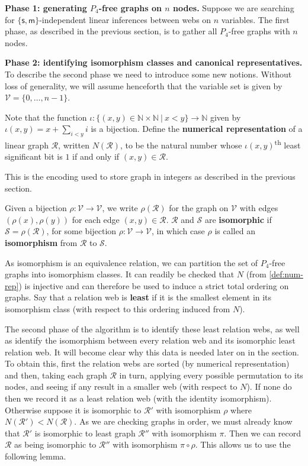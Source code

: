 \documentclass[a4paper, UKenglish, cleveref]{lipics-v2021}
\newcommand{\V}{\ensuremath{\mathcal{V}}}
\newcommand{\R}{\ensuremath{\mathcal{R}}}
\renewcommand*{\S}{\ensuremath{\mathcal{S}}}
\newcommand{\m}{\ensuremath{\mathsf{m}}}
\newcommand{\s}{\ensuremath{\mathsf{s}}}
\begin{document}
\textbf{Phase 1: generating $P_4$-free graphs on $n$ nodes.}
Suppose we are searching for $\{\s,\m \}$-independent linear inferences between webs on \(n\) variables. The first phase, as described in the previous section, is to gather all \(P_4\)-free graphs with \(n\) nodes.

\smallskip

\textbf{Phase 2: identifying isomorphism classes and canonical representatives.}
To describe the second phase we need to introduce some new notions. Without loss of generality, we will assume henceforth that the variable set is given by \(\V = \{0,\dots,n-1\}\).


\begin{definition}\label{def:num-rep}
Note that the function $\iota : \{(x,y) \in \mathbb{N} \times \mathbb{N}\ |\ x < y\} \to \mathbb{N}$ given by \(\iota(x,y) = x + \sum_{i < y} i\) is a bijection.
  Define the \textbf{numerical representation} of a linear graph \(\R\), written \(N(\R)\), to be the natural number whose \(\iota(x,y)\)\textsuperscript{th} least significant bit is \(1\) if and only if \((x,y) \in \R\).
\end{definition}
\noindent
This is the encoding used to store graph in integers as described in the previous section.

\begin{definition}
Given a bijection $\rho: \V\to \V$, we write $\rho(\R)$ for the graph on $\V$ with edges $(\rho(x),\rho(y))$ for each edge $(x,y) \in \R$.
$\R$ and $\S$ are \textbf{isomorphic} if $\S = \rho(\R)$, for some bijection $\rho: \V\to \V$, in which case $\rho$ is called an \textbf{isomorphism} from $\R $ to $\S$.
\end{definition}

As isomorphism is an equivalence relation, we can partition the set of \(P_4\)-free graphs into isomorphism classes. It can readily be checked that \(N\) (from \cref{def:num-rep}) is injective and can therefore be used to induce a strict total ordering on graphs. Say that a relation web is \textbf{least} if it is the smallest element in its isomorphism class (with respect to this ordering induced from \(N\)).

The second phase of the algorithm is to identify these least relation webs, as well as identify the isomorphism between every relation web and its isomorphic least relation web. It will become clear why this data is needed later on in the section. To obtain this, first the relation webs are sorted (by numerical representation) and then, taking each graph \(\R\) in turn, applying every possible permutation to its nodes, and seeing if any result in a smaller web (with respect to $N$). If none do then we record it as a least relation web (with the identity isomorphism). Otherwise suppose it is isomorphic to \(\R'\) with isomorphism \(\rho\) where \(N(\R') < N(\R)\). As we are checking graphs in order, we must already know that \(\R'\) is isomorphic to least graph \(\R''\) with isomorphism \(\pi\). Then we can record \(\R\) as being isomorphic to \(\R''\) with isomorphism \(\pi \circ \rho\). This allows us to use the following lemma.
\end{document}
